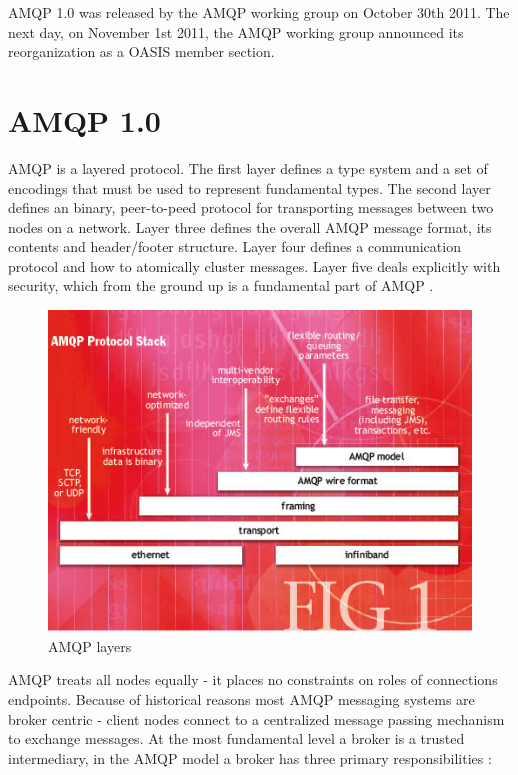 \documentclass{thesis}
\begin{document}
AMQP 1.0 was released by the AMQP working group on October 30th 2011.  The next day, on November 1st 2011, the AMQP working group announced its reorganization as a OASIS member section. \cite{AMQP}

\section{AMQP 1.0}
AMQP is a layered protocol.  The first layer defines a type system and a set of encodings that must be used to represent fundamental types.  The second layer defines an binary, peer-to-peed protocol for transporting messages between two nodes on a network.  Layer three defines the overall AMQP message format, its contents and header/footer structure.  Layer four defines a communication protocol and how to atomically cluster messages.  Layer five deals explicitly with security, which from the ground up is a fundamental part of AMQP \cite{AMQP1.0}. 

\begin{figure}[h]
\centering
\includegraphics[scale=.75]{ohara1.jpg}  
\caption{AMQP layers}
\end{figure}

AMQP treats all nodes equally - it places no constraints on roles of connections endpoints.   Because of historical reasons most AMQP messaging systems are broker centric - client nodes connect to a centralized message passing mechanism to exchange messages.  At the most fundamental level a broker is a trusted intermediary, in the AMQP model a broker has three primary responsibilities \cite{o2007toward}:
\end{document}
